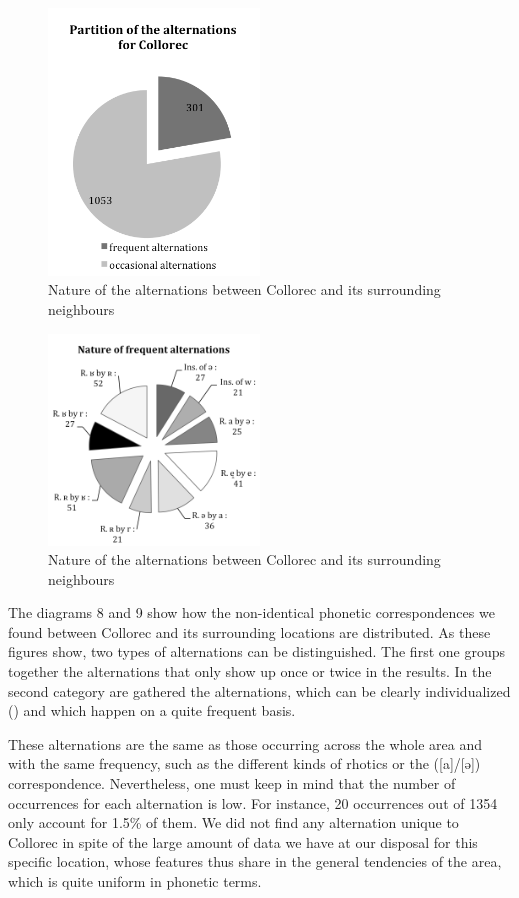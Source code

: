 \documentclass[output=paper]{LSP/langsci}
\begin{document}
\begin{figure}
\includegraphics[width=0.5\textwidth]{illustrations/brun_etal_fig8}
\caption{Nature of the alternations between Collorec and its surrounding neighbours}
\label{fig:8}
\end{figure}

\begin{figure}
\includegraphics[width=0.5\textwidth]{illustrations/brun_etal_fig9}
\caption{Nature of the alternations between Collorec and its surrounding neighbours}
\label{fig:9}
\end{figure}

The diagrams 8 and 9 show how the non-identical phonetic correspondences we found between Collorec and its surrounding locations are distributed. As these figures show, two types of alternations can be distinguished. The first one groups together the alternations that only show up once or twice in the results. In the second category are gathered the alternations, which can be clearly individualized () and which happen on a quite frequent basis.

These alternations are the same as those occurring across the whole area and with the same frequency, such as the different kinds of rhotics or the ([a]/[ə]) correspondence. Nevertheless, one must keep in mind that the number of occurrences for each alternation is low. For instance, 20 occurrences out of 1354 only account for 1.5\% of them. We did not find any alternation unique to Collorec in spite of the large amount of data we have at our disposal for this specific location, whose features thus share in the general tendencies of the area, which is quite uniform in phonetic terms.
\end{document}
